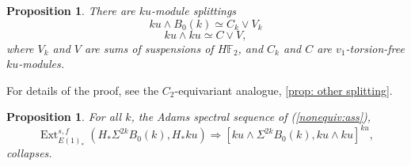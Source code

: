 \documentclass{amsart}
\newtheorem{proposition}[equation]{Proposition}
\theoremstyle{plain}
\numberwithin{equation}{section}
\numberwithin{figure}{section}
\DeclareMathOperator{\Ext}{Ext}
\newcommand{\mF}{{\mathbb F}}
\newcommand{\0}{\langle 0 \rangle }
\begin{document}
\begin{proposition}\label{nonequiv: other splitting}
There are $ku$-module splittings
    \[ ku \wedge B_{0}(k) \simeq C_{k} \vee V_{k}\]
     \[ ku \wedge ku \simeq C \vee V,\]
     where $V_{k}$ and $ V$ are sums of suspensions of $H\mF_{2}$, and $C_k$ and $C$ are $v_{1}$-torsion-free $ku$-modules.
\end{proposition}

For details of the proof, see the $C_2$-equivariant analogue, \cref{prop: other splitting}.

\begin{proposition}\label{nonequiv: collapse}
    For all $k$, the Adams spectral sequence of (\ref{nonequiv:ass}), 
    \[
    \Ext_{E(1)_{*}}^{s,f} \left(H_{*} \Sigma^{2k} B_{0}(k), H_{*}ku \right) \Longrightarrow [ku \wedge \Sigma^{2k}B_{0}(k), ku \wedge ku]^{ku},
    \]
    collapses.
\end{proposition}
\end{document}
